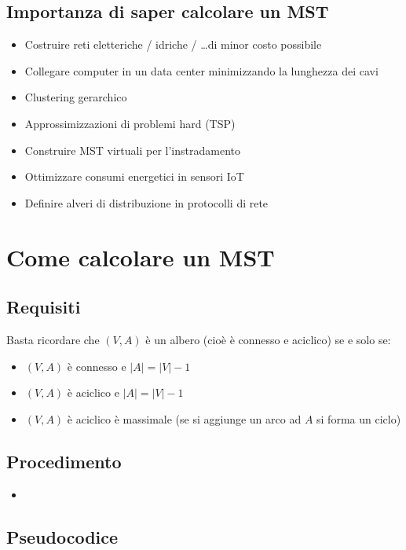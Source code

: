 \subsection{Importanza di saper calcolare un MST}
\begin{itemize}
    \item Costruire reti eletteriche / idriche / \dots di minor costo possibile
    \item Collegare computer in un data center minimizzando la lunghezza dei cavi
    \item Clustering gerarchico
    \item Approssimizzazioni di problemi hard (TSP)
    \item Construire MST virtuali per l'instradamento
    \item Ottimizzare consumi energetici in sensori IoT
    \item Definire alveri di distribuzione in protocolli di rete
\end{itemize}

\newpage
\section{Come calcolare un MST}

\subsection{Requisiti}
Basta ricordare che $(V,A)$ è un albero (cioè è connesso e aciclico) se e solo se:
\begin{itemize}
    \item $(V,A)$ è connesso e $|A| = |V| - 1$
    \item $(V,A)$ è aciclico e $|A| = |V| - 1$
    \item $(V,A)$ è aciclico è massimale (se si aggiunge un arco ad $A$ si forma un ciclo)
\end{itemize}

\subsection{Procedimento}
\begin{itemize}
    \item 
\end{itemize}

\subsection{Pseudocodice}